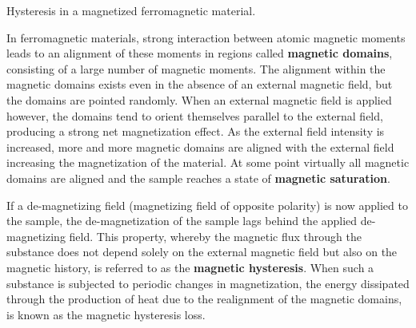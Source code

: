 \begin{marginfigure}
\caption{Hysteresis in a magnetized ferromagnetic material.}
\label{fig:he4}
\end{marginfigure}

In ferromagnetic materials, strong interaction between atomic magnetic moments leads to an alignment of these moments in regions called {\bf magnetic domains}, consisting of a large number of magnetic moments. The alignment within the magnetic domains exists even in the absence of an external magnetic field, but the domains are pointed randomly. When an external magnetic field is applied however, the domains tend to orient themselves parallel to the external field, producing a strong net magnetization effect. As the external field intensity is increased, more and more magnetic domains are aligned with the external field increasing the magnetization of the material. At some point virtually all magnetic domains are aligned and the sample reaches a state of {\bf magnetic saturation}. 

If a de-magnetizing field (magnetizing field of opposite polarity) is now applied to the sample, the de-magnetization of the sample lags behind the applied de-magnetizing field. This property, whereby the magnetic flux through the substance does not depend solely on the external magnetic field but also on the magnetic history, is referred to as the {\bf magnetic hysteresis}. When such a substance is subjected to periodic changes in magnetization, the energy dissipated through the production of heat due to the realignment of the magnetic domains, is known as the magnetic hysteresis loss. 

